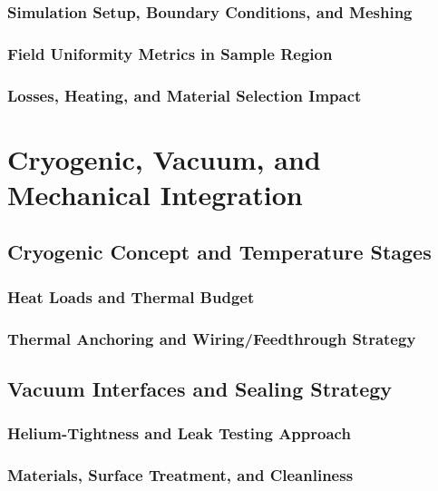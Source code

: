 \documentclass[FM,DP,EN,twoside]{tulthesis}
\begin{document}
\subsection{Simulation Setup, Boundary Conditions, and Meshing}
\label{subsec:mw-simulation-setup}
\subsection{Field Uniformity Metrics in Sample Region}
\label{subsec:mw-field-uniformity-metrics}
\subsection{Losses, Heating, and Material Selection Impact}
\label{subsec:mw-losses-heating-material}

\chapter{Cryogenic, Vacuum, and Mechanical Integration}
\label{sec:cryogenic-vacuum-mechanical-integration}
\section{Cryogenic Concept and Temperature Stages}
\label{sec:cryogenic-concept-temperature-stages}
\subsection{Heat Loads and Thermal Budget}
\label{subsec:heat-loads-thermal-budget}
\subsection{Thermal Anchoring and Wiring/Feedthrough Strategy}
\label{subsec:thermal-anchoring-feedthroughs}
\section{Vacuum Interfaces and Sealing Strategy}
\label{sec:vacuum-interfaces-sealing}
\subsection{Helium-Tightness and Leak Testing Approach}
\label{subsec:helium-tightness-leak-testing}
\subsection{Materials, Surface Treatment, and Cleanliness}
\label{subsec:materials-surface-cleanliness}
\end{document}
